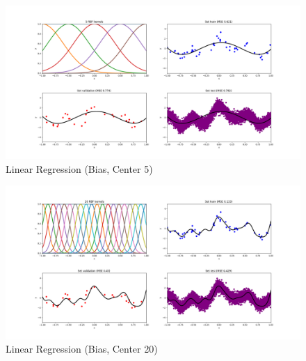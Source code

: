 \documentclass[12pt,halfline,a4paper]{ouparticle}
\begin{document}
	\begin{figure}[H]
	\centering
	        \includegraphics[width=\textwidth]{figures/linreg_bias_c5.png}
	    \caption{Linear Regression (Bias, Center 5)}
	\end{figure}
	\begin{figure}[H]
	\centering
	        \includegraphics[width=\textwidth]{figures/linreg_bias_c20.png}
	    \caption{Linear Regression (Bias, Center 20)}
	\end{figure}
\end{document}

